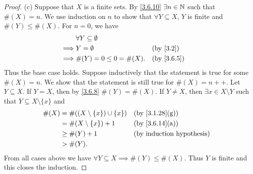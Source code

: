\begin{proof}{(c)}
  Suppose that \(X\) is a finite sets.
  By \cref{3.6.10} \(\exists n \in \mathbb{N}\) such that \(\#(X) = n\).
  We use induction on \(n\) to show that \(\forall Y \subseteq X\), \(Y\) is finite and \(\#(Y) \leq \#(X)\).
  For \(n = 0\), we have
  \begin{align*}
             & \forall Y \subseteq \emptyset                             \\
    \implies & Y = \emptyset                 &  & \text{(by \cref{3.2})} \\
    \implies & \#(Y) = 0 \leq 0 = \#(X).     &  & \by{3.6.5}
  \end{align*}
  Thus the base case holds.
  Suppose inductively that the statement is true for some \(\#(X) = n\).
  We show that the statement is still true for \(\#(X) = n++\).
  Let \(Y \subseteq X\).
  If \(Y = X\), then by \cref{3.6.8} \(\#(Y) = \#(X)\).
  If \(Y \neq X\), then \(\exists x \in X \setminus Y\) such that \(Y \subseteq X \setminus \{x\}\) and
  \begin{align*}
    \#(X) & = \#((X \setminus \{x\}) \cup \{x\}) &  & \text{(by \cref{3.1.28}(g))} \\
          & = \#(X \setminus \{x\}) + 1          &  & \text{(by \cref{3.6.14}(a))} \\
          & \geq \#(Y) + 1                       &  & \byIH                        \\
          & > \#(Y).
  \end{align*}
  From all cases above we have \(\forall Y \subseteq X \implies \#(Y) \leq \#(X)\).
  Thus \(Y\) is finite and this closes the induction.


\end{proof}
